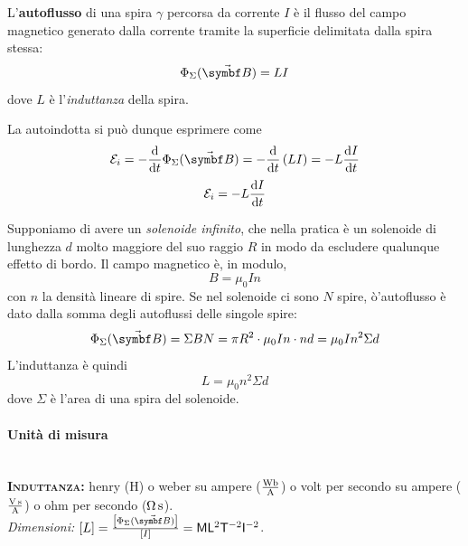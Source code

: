 \begin{define}[Autoflusso]
	L'\textbf{autoflusso} di una spira $\gamma$ percorsa da corrente $I$ è il flusso del campo magnetico generato dalla corrente tramite la superficie delimitata dalla spira stessa:
	\begin{equation}
		\Phi_{\Sigma}(\vba{B})=LI
	\end{equation}
	dove $L$ è l'\textit{induttanza} della spira.
\end{define}
La \fem autoindotta si può dunque esprimere come
\begin{equation*}
	\mathcal{E}_i=-\dv{t}\Phi_{\Sigma}(\vba{B})=-\dv{t}\left(LI\right)=-L\dv{I}{t}
\end{equation*}
\begin{equation}
	\mathcal{E}_i=-L\dv{I}{t}
\end{equation}
\begin{example}
	Supponiamo di avere un \textit{solenoide infinito}, che nella pratica è un solenoide di lunghezza $d$ molto maggiore del suo raggio $R$ in modo da escludere qualunque effetto di bordo. Il campo magnetico è, in modulo,
	\begin{equation*}
		B=\mu_0 I n
	\end{equation*}
	con $n$ la densità lineare di spire. Se nel solenoide ci sono $N$ spire, ò'autoflusso è dato dalla somma degli autoflussi delle singole spire:
	\begin{equation}
		\Phi_{\Sigma}(\vba{B})=\Sigma B N=\pi R^2 \cdot \mu_0 I n \cdot nd=\mu_0 I n^2\Sigma d
	\end{equation}
	L'induttanza è quindi
	\begin{equation}
		L=\mu_0 n^2\Sigma d
	\end{equation}
	dove $\Sigma$ è l'area di una spira del solenoide.
\end{example}
\paragraph{Unità di misura}
\begin{units}~\\
	\textbf{\textsc{Induttanza:}} henry ($\unit{\henry}$) o weber su ampere  ($\unit[per-mode = fraction]{\weber\per\ampere}$) o volt per secondo su ampere ($\unit[per-mode = fraction]{\volt\second\per\ampere}$) o ohm per secondo ($\unit[per-mode = fraction]{\ohm\second}$).\\
	\textit{Dimensioni:} $[L]=\frac{\left[\Phi_{\Sigma}(\vba{B})\right]}{\left[I\right]}=\mathsf{M} \mathsf{L}^2 \mathsf{T}^{-2} \mathsf{I}^{-2}$.
\end{units}
